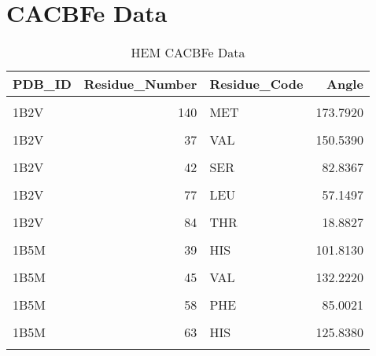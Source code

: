 \section{CACBFe Data}
	\begin{table}
		\caption{HEM CACBFe Data}
		\label{tbl:HEM_cab}
		\centering
		\begin{tabular}{lrlr}
			\toprule
			PDB\_ID & Residue\_Number & Residue\_Code & Angle\\
			\midrule
			\cellcolor{gray!6}{1B2V} & \cellcolor{gray!6}{137} & \cellcolor{gray!6}{TYR} & \cellcolor{gray!6}{107.0750}\\
			1B2V & 140 & MET & 173.7920\\
			\cellcolor{gray!6}{1B2V} & \cellcolor{gray!6}{32} & \cellcolor{gray!6}{HIS} & \cellcolor{gray!6}{116.3150}\\
			1B2V & 37 & VAL & 150.5390\\
			\cellcolor{gray!6}{1B2V} & \cellcolor{gray!6}{41} & \cellcolor{gray!6}{ASN} & \cellcolor{gray!6}{79.4068}\\
			\addlinespace
			1B2V & 42 & SER & 82.8367\\
			\cellcolor{gray!6}{1B2V} & \cellcolor{gray!6}{75} & \cellcolor{gray!6}{TYR} & \cellcolor{gray!6}{132.4540}\\
			1B2V & 77 & LEU & 57.1497\\
			\cellcolor{gray!6}{1B2V} & \cellcolor{gray!6}{83} & \cellcolor{gray!6}{HIS} & \cellcolor{gray!6}{102.9160}\\
			1B2V & 84 & THR & 18.8827\\
			\addlinespace
			\cellcolor{gray!6}{1B5M} & \cellcolor{gray!6}{35} & \cellcolor{gray!6}{PHE} & \cellcolor{gray!6}{126.8820}\\
			1B5M & 39 & HIS & 101.8130\\
			\cellcolor{gray!6}{1B5M} & \cellcolor{gray!6}{40} & \cellcolor{gray!6}{PRO} & \cellcolor{gray!6}{84.9302}\\
			1B5M & 45 & VAL & 132.2220\\
			\cellcolor{gray!6}{1B5M} & \cellcolor{gray!6}{46} & \cellcolor{gray!6}{LEU} & \cellcolor{gray!6}{104.5310}\\
			\addlinespace
			1B5M & 58 & PHE & 85.0021\\
			\cellcolor{gray!6}{1B5M} & \cellcolor{gray!6}{61} & \cellcolor{gray!6}{VAL} & \cellcolor{gray!6}{142.4900}\\
			1B5M & 63 & HIS & 125.8380\\
			\cellcolor{gray!6}{1B5M} & \cellcolor{gray!6}{67} & \cellcolor{gray!6}{ALA} & \cellcolor{gray!6}{143.9450}\\

\end{tabular}
\end{table}
